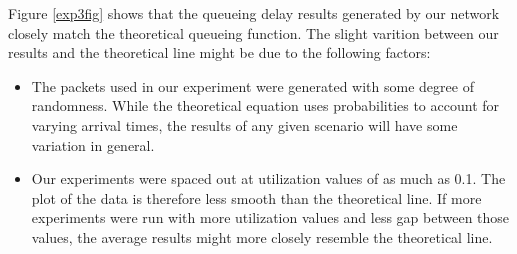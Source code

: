\documentclass[11pt]{article}
\begin{document}
Figure \ref{exp3fig} shows that the queueing delay results generated by our network closely match the theoretical queueing function. The slight varition between our results and the theoretical line might be due to the following factors:

\begin{itemize}
\item The packets used in our experiment were generated with some degree of randomness. While the theoretical equation uses probabilities to account for varying arrival times, the results of any given scenario will have some variation in general.
\item Our experiments were spaced out at utilization values of as much as 0.1. The plot of the data is therefore less smooth than the theoretical line. If more experiments were run with more utilization values and less gap between those values, the average results might more closely resemble the theoretical line.
\end{itemize}
\end{document}
